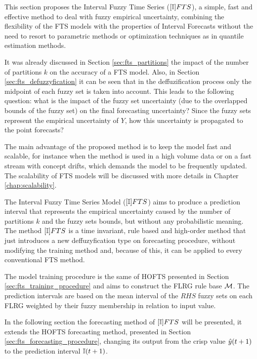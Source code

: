 This section proposes the Interval Fuzzy Time Series ($[\mathbb{I}]FTS$), a simple, fast and effective method to deal with fuzzy empirical uncertainty, combining the flexibility of the FTS models with the properties of Interval Forecasts without the need to resort to parametric methods or optimization techniques as in quantile estimation methods.

It was already discussed in Section \ref{sec:fts_partitions} the impact of the number of partitions $k$ on the accuracy of a FTS model. Also, in Section \ref{sec:fts_defuzzyfication} it can be seen that in the deffuzification process only the midpoint of each fuzzy set is taken into account. This leads to the following question: what is the impact of the fuzzy set uncertainty (due to the overlapped bounds of the fuzzy set) on the final forecasting uncertainty? Since  the fuzzy sets represent the empirical uncertainty of $Y$, how this uncertainty is propagated to the point forecasts?

 The main advantage of the proposed method is to keep the model fast and scalable, for instance when the method is used in a high volume data or on a fast stream with concept drifts, which demands the model to be frequently updated. The scalability of FTS models will be discussed with more details in Chapter \ref{chap:scalability}.

The Interval Fuzzy Time Series Model ($[\mathbb{I}]FTS$) aims to produce a prediction interval that represents the empirical uncertainty caused by the number of partitions $k$ and the fuzzy sets bounds, but without any probabilistic meaning. The method $[\mathbb{I}]FTS$ is a time invariant, rule based and high-order method that just  introduces a new deffuzyfication type on forecasting procedure, without modifying the training method and, because of this, it can be applied to every conventional FTS method.  

The model training procedure is the same of HOFTS presented in Section \ref{sec:fts_training_procedure} and aims to construct the FLRG rule base $\mathcal{M}$. The prediction intervals are based on the mean interval of the $RHS$ fuzzy sets on each FLRG weighted by their fuzzy membership in relation to input value.

In the following section the forecasting method of $[\mathbb{I}]FTS$ will be presented, it extends the HOFTS forecasting method, presented in Section \ref{sec:fts_forecasting_procedure}, changing its output from the crisp value $\hat{y}(t+1)$ to the prediction interval $\mathbb{I}(t+1)$.

%
